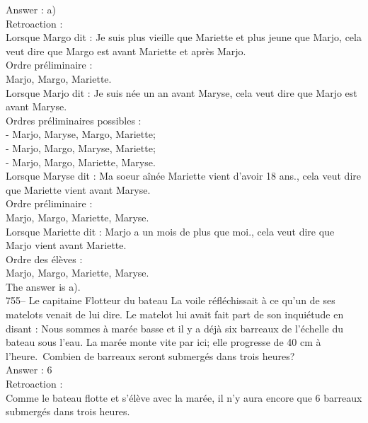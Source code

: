 ﻿\documentclass[letterpaper, 12pt]{article}
\begin{document}
Answer : a)\\

Retroaction : \\
Lorsque Margo dit : \og Je suis plus vieille que Mariette et plus
jeune que Marjo\fg , cela veut dire que Margo est avant Mariette et
apr\`es Marjo.\\

Ordre pr\'eliminaire :\\
Marjo, Margo, Mariette.\\

Lorsque Marjo dit : \og Je suis n\'ee un an avant Maryse\fg , cela
veut dire que Marjo est avant Maryse.\\

Ordres pr\'eliminaires possibles :\\
- Marjo, Maryse, Margo, Mariette;\\
- Marjo, Margo, Maryse, Mariette;\\
- Marjo, Margo, Mariette, Maryse.\\

Lorsque Maryse dit : \og Ma soeur a\^in\'ee Mariette vient d'avoir
18 ans.\fg , cela veut dire  que Mariette vient avant Maryse.\\

Ordre pr\'eliminaire :\\
Marjo, Margo, Mariette, Maryse.\\

Lorsque Mariette dit : \og Marjo a un mois de plus que moi.\fg ,
cela veut dire que Marjo vient avant Mariette.\\

Ordre des \'el\`eves :\\
Marjo, Margo, Mariette, Maryse.\\

The answer is a).\\

755-- Le capitaine Flotteur du bateau La voile r\'efl\'echissait \`a
ce qu'un de ses matelots venait de lui dire.  Le matelot lui avait
fait part de son inqui\'etude en disant : \og Nous sommes \`a
mar\'ee basse et il y a d\'ej\`a  six barreaux de l'\'echelle du
bateau sous l'eau.  La mar\'ee monte vite par ici; elle progresse de
40 cm \`a l'heure.\fg\  Combien de
barreaux seront submerg\'es dans trois heures?\\


Answer : 6\\

Retroaction : \\
Comme le bateau flotte et s'\'el\`eve avec la mar\'ee, il n'y aura encore
que 6 barreaux submerg\'es dans trois heures.\\
\end{document}
